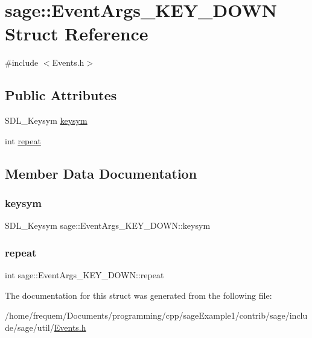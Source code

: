 \hypertarget{structsage_1_1EventArgs__KEY__DOWN}{}\section{sage\+::Event\+Args\+\_\+\+K\+E\+Y\+\_\+\+D\+O\+WN Struct Reference}
\label{structsage_1_1EventArgs__KEY__DOWN}


{\ttfamily \#include $<$Events.\+h$>$}

\subsection*{Public Attributes}
\begin{DoxyCompactItemize}
\item 
S\+D\+L\+\_\+\+Keysym \mbox{\hyperlink{structsage_1_1EventArgs__KEY__DOWN_af9d99f6ee37f3c7186f72525e882d0a6}{keysym}}
\item 
int \mbox{\hyperlink{structsage_1_1EventArgs__KEY__DOWN_a2b4b20491bb7dd6579fdb7eeeb204588}{repeat}}
\end{DoxyCompactItemize}


\subsection{Member Data Documentation}
\mbox{\label{structsage_1_1EventArgs__KEY__DOWN_af9d99f6ee37f3c7186f72525e882d0a6}} 
\subsubsection{\texorpdfstring{keysym}{keysym}}
{\footnotesize\ttfamily S\+D\+L\+\_\+\+Keysym sage\+::\+Event\+Args\+\_\+\+K\+E\+Y\+\_\+\+D\+O\+W\+N\+::keysym}

\mbox{\label{structsage_1_1EventArgs__KEY__DOWN_a2b4b20491bb7dd6579fdb7eeeb204588}} 
\subsubsection{\texorpdfstring{repeat}{repeat}}
{\footnotesize\ttfamily int sage\+::\+Event\+Args\+\_\+\+K\+E\+Y\+\_\+\+D\+O\+W\+N\+::repeat}



The documentation for this struct was generated from the following file\+:\begin{DoxyCompactItemize}
\item 
/home/frequem/\+Documents/programming/cpp/sage\+Example1/contrib/sage/include/sage/util/\mbox{\hyperlink{Events_8h}{Events.\+h}}\end{DoxyCompactItemize}
